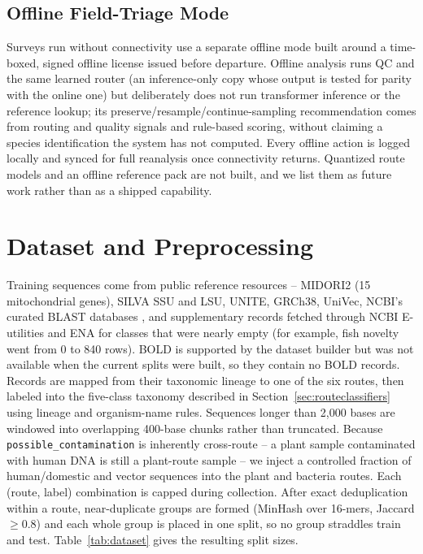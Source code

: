 \documentclass[conference]{IEEEtran}
\begin{document}
\subsection{Offline Field-Triage Mode}

Surveys run without connectivity use a separate offline mode built around a time-boxed, signed offline license issued before departure. Offline analysis runs QC and the same learned router (an inference-only copy whose output is tested for parity with the online one) but deliberately does not run transformer inference or the reference lookup; its preserve/resample/continue-sampling recommendation comes from routing and quality signals and rule-based scoring, without claiming a species identification the system has not computed. Every offline action is logged locally and synced for full reanalysis once connectivity returns. Quantized route models and an offline reference pack are not built, and we list them as future work rather than as a shipped capability.

\section{Dataset and Preprocessing}

Training sequences come from public reference resources -- MIDORI2 (15 mitochondrial genes), SILVA SSU and LSU, UNITE, GRCh38, UniVec, NCBI's curated BLAST databases \cite{altschul1990blast}, and supplementary records fetched through NCBI E-utilities and ENA for classes that were nearly empty (for example, fish novelty went from 0 to 840 rows). BOLD \cite{ratnasingham2007bold} is supported by the dataset builder but was not available when the current splits were built, so they contain no BOLD records. Records are mapped from their taxonomic lineage to one of the six routes, then labeled into the five-class taxonomy described in Section~\ref{sec:routeclassifiers} using lineage and organism-name rules. Sequences longer than 2{,}000 bases are windowed into overlapping 400-base chunks rather than truncated. Because \texttt{possible\_contamination} is inherently cross-route -- a plant sample contaminated with human DNA is still a plant-route sample -- we inject a controlled fraction of human/domestic and vector sequences into the plant and bacteria routes. Each (route, label) combination is capped during collection. After exact deduplication within a route, near-duplicate groups are formed (MinHash over 16-mers, Jaccard $\geq 0.8$) and each whole group is placed in one split, so no group straddles train and test. Table~\ref{tab:dataset} gives the resulting split sizes.
\end{document}
